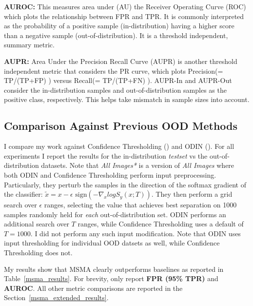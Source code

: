 \textbf{AUROC:} This measures area under (AU) the Receiver Operating Curve (ROC) which plots the relationship between FPR and TPR. It is commonly interpreted as the probability of a positive sample (in-distribution) having a higher score than a negative sample (out-of-distribution). It is a threshold independent, summary metric.

\textbf{AUPR:} Area Under the Precision Recall Curve (AUPR) is another threshold independent metric that considers the PR curve, which plots Precision(= TP/(TP+FP) ) versus Recall(= TP/(TP+FN) ). AUPR-In and AUPR-Out consider the in-distribution samples and out-of-distribution samples as the positive class, respectively. This helps take mismatch in sample sizes into account.

\subsection*{Comparison Against Previous OOD Methods}
\label{ood_experiments}

I compare my work against Confidence Thresholding (\cite{Devries}) and ODIN (\cite{Liang2017}). For all experiments I report the results for the in-distribution \textit{testset} vs the out-of-distribution datasets. Note that \textit{All Images*} is a version of \textit{All Images} where both ODIN and Confidence Thresholding perform input preprocessing. Particularly, they perturb the samples in the direction of the softmax gradient of the classifier:
$\tilde{x} = x - \epsilon \text{ sign} (- \nabla_x log S_y(x;T))$.
They then perform a grid search over $\epsilon$ ranges, selecting the value that achieves best separation on 1000 samples randomly held for \textit{each} out-of-distribution set. ODIN performs an additional search over $T$ ranges, while Confidence Thresholding uses a default of $T=1000$. I did not perform any such input modification. Note that ODIN uses input thresholding for individual OOD datsets as well, while Confidence Thresholding does not. 

My results show that MSMA clearly outperforms baselines as reported in Table~\ref{msma_results}. For brevity, only report \textbf{ FPR (95\% TPR)} and \textbf{AUROC}. All other metric comparisons are reported in the Section~\ref{msma_extended_results}. 

